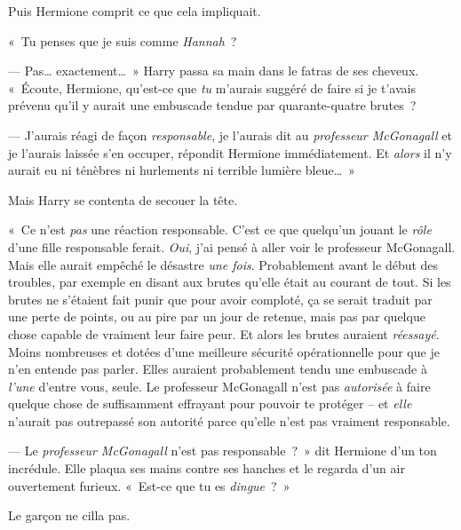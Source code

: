 Puis Hermione comprit ce que cela impliquait.

«~Tu penses que je suis comme \emph{Hannah}~?

--- Pas… exactement…~» Harry passa sa main dans le fatras de ses cheveux. «~Écoute, Hermione, qu'est-ce que \emph{tu} m'aurais suggéré de faire si je t'avais prévenu qu'il y aurait une embuscade tendue par quarante-quatre brutes~?

--- J'aurais réagi de façon \emph{responsable}, je l'aurais dit au \emph{professeur McGonagall} et je l'aurais laissée s'en occuper, répondit Hermione immédiatement. Et \emph{alors} il n'y aurait eu ni ténèbres ni hurlements ni terrible lumière bleue…~»

Mais Harry se contenta de secouer la tête.

«~Ce n'est \emph{pas} une réaction responsable. C'est ce que quelqu'un jouant le \emph{rôle} d'une fille responsable ferait. \emph{Oui}, j'ai pensé à aller voir le professeur McGonagall. Mais elle aurait empêché le désastre \emph{une fois}. Probablement avant le début des troubles, par exemple en disant aux brutes qu'elle était au courant de tout. Si les brutes ne s'étaient fait punir que pour avoir comploté, ça se serait traduit par une perte de points, ou au pire par un jour de retenue, mais pas par quelque chose capable de vraiment leur faire peur. Et alors les brutes auraient \emph{réessayé}. Moins nombreuses et dotées d'une meilleure sécurité opérationnelle pour que je n'en entende pas parler. Elles auraient probablement tendu une embuscade à \emph{l'une} d'entre vous, seule. Le professeur McGonagall n'est pas \emph{autorisée} à faire quelque chose de suffisamment effrayant pour pouvoir te protéger -- et \emph{elle} n'aurait pas outrepassé son autorité parce qu'elle n'est pas vraiment responsable.

--- Le \emph{professeur McGonagall} n'est pas responsable~?~» dit Hermione d'un ton incrédule. Elle plaqua ses mains contre ses hanches et le regarda d'un air ouvertement furieux. «~Est-ce que tu es \emph{dingue}~?~»

Le garçon ne cilla pas.

